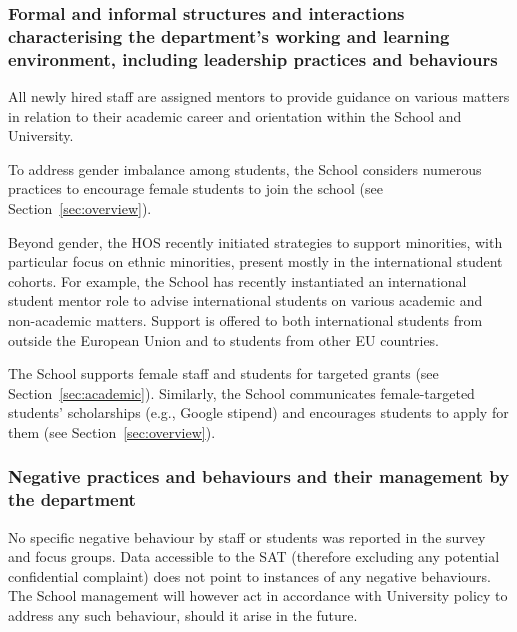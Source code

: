 \subsubsection{Formal and informal structures and interactions characterising the department's working and learning environment, including leadership practices and behaviours}

All newly hired staff are assigned mentors to provide guidance on various matters in relation to their academic career and orientation within the School and University. %

To address gender imbalance among students, the School considers numerous practices to encourage female students to join the school (see Section~\ref{sec:overview}).

Beyond gender, the \ac{HOS} recently initiated strategies to support minorities, with particular focus on ethnic minorities, present mostly in the international student cohorts. For example, the School has recently instantiated an international student mentor role to advise international students on various academic and non-academic matters. Support is offered to both international students from outside the European Union and to students from other EU countries. 


The School supports female staff and students for targeted grants (see Section~\ref{sec:academic}). Similarly, the School communicates female-targeted students' scholarships (e.g., Google stipend) and encourages  students to apply for them (see Section~\ref{sec:overview}). 



\subsubsection{Negative practices and behaviours and their management by the department}

No specific negative behaviour by staff or students was reported in the survey and focus groups. Data accessible to the \ac{SAT} (therefore excluding any potential confidential complaint) does not point to instances of any negative behaviours. The School management will however act in accordance with University policy to address any such behaviour, should it arise in the future. 

